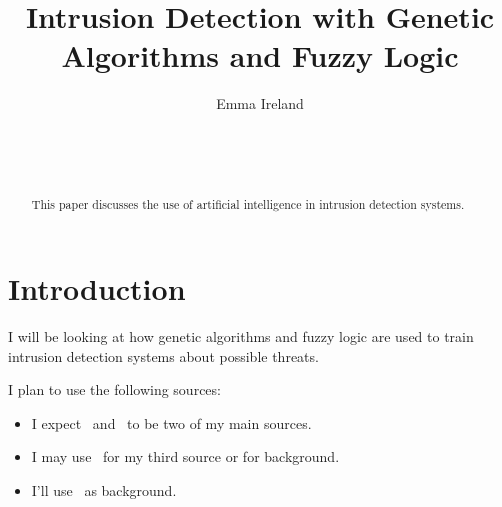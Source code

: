 \documentclass{sig-alternate}
\begin{document}

\title{Intrusion Detection with Genetic Algorithms and Fuzzy Logic}


\author{
\alignauthor
Emma Ireland\\
	\\
	\\
	\\
}

\maketitle

\begin{abstract}
This paper discusses the use of artificial intelligence in intrusion detection systems.
\end{abstract}




\section{Introduction}
I will be looking at how genetic algorithms and fuzzy logic are used to train intrusion detection systems about possible threats.

I plan to use the following sources:
\begin{itemize}
\item I expect~\cite{DBLP:journals/corr/abs-1204-1336} and~\cite{6496342} to be two of my main sources.
\item I may use~\cite{bc1_ecindm} for my third source or for background. 
\item I'll use~\cite{Liao201316, DBLP:journals/corr/abs-1204-6416, bapuji2012soft} as background. 
\end{itemize}
\end{document}
